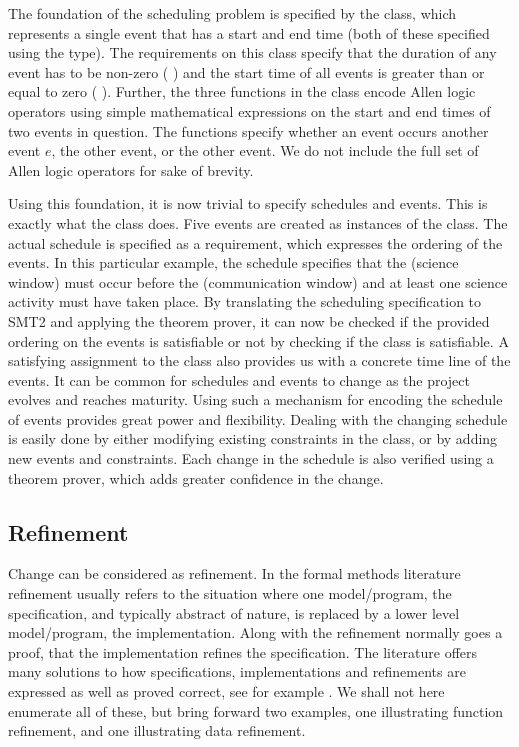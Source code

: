 The foundation of the scheduling problem is specified by the
 class, which represents a single event that has a start
and end time (both of these specified using the  type). The
requirements on this class specify that the duration of any event has
to be non-zero ( ) and the start time
of all events is greater than or equal to zero (
). Further, the three functions in the 
class encode Allen logic operators \cite{allen-logic-84} 
using simple mathematical
expressions on the start and end times of two events in
question. The functions specify whether an event occurs
 another event $e$,  the other event, or
 the other event. We do not include the full set of
Allen logic operators for sake of brevity. 

Using this foundation, it is now
trivial to specify schedules and events. This is exactly what the
 class does. Five events are created as instances of
the  class. The actual schedule is specified as a
requirement, which expresses the ordering of the events. In this
particular example, the schedule specifies that the 
(science window) must occur before the  (communication
window) and at least one science
activity must have taken place. By translating the scheduling
specification to SMT2 and applying the \zthree{} theorem prover, it can now 
be checked if the provided ordering on the events is satisfiable or not by checking
if the  class is satisfiable. A satisfying assignment
to the class also provides us with a concrete time line of the events.
It can be common for schedules and events to change as the project
evolves and reaches maturity. Using such a mechanism for encoding the
schedule of events provides great power and flexibility. Dealing with
the changing schedule is easily done by either modifying existing
constraints in the  class, or by adding new events and
constraints. Each change in the schedule is also verified using a
theorem prover, which adds greater confidence in the change.


\subsection{Refinement}

Change can be considered as refinement. In the formal methods literature
refinement usually refers to the situation where one model/program, the 
specification, and typically abstract of nature, is replaced by a lower 
level model/program, the implementation. Along with the refinement normally
goes a proof, that the implementation refines the specification.
The literature offers many solutions to how specifications, implementations and 
refinements are expressed as well as proved correct, see for example 
\cite{vdm,raise92,george-raise-2008}. We shall not here enumerate all of these, but bring forward two examples, one illustrating function refinement, and one illustrating data refinement.

